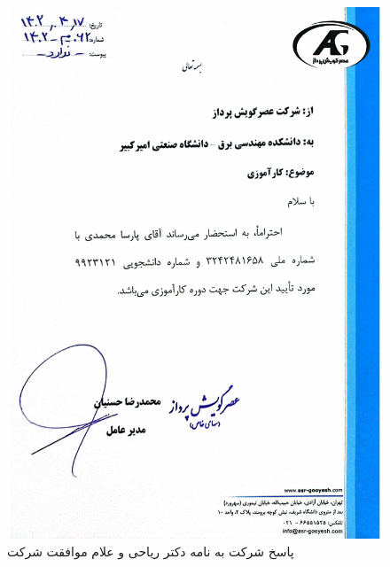 \begin{figure}[H]
  \centering
  \includegraphics[width=1\textwidth]{letters/riahi_anwser.pdf}
  \caption{
  پاسخ شرکت به نامه دکتر ریاحی و علام موافقت شرکت
  }
  \label{img:riahi_anwser}
\end{figure}

